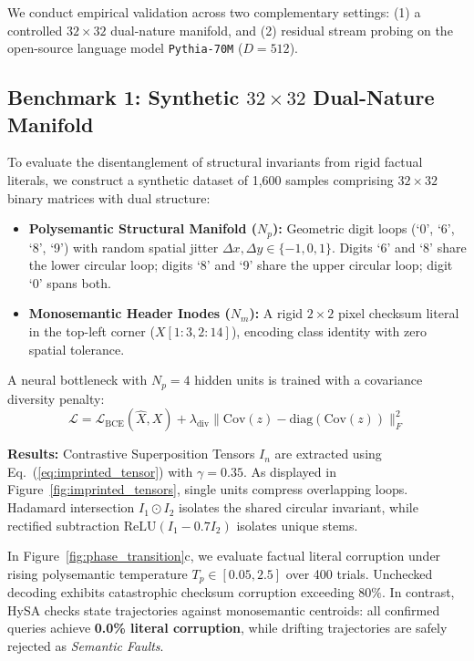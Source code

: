 \documentclass[11pt,a4paper]{article}
\theoremstyle{definition}
\begin{document}
We conduct empirical validation across two complementary settings: (1) a controlled $32 \times 32$ dual-nature manifold, and (2) residual stream probing on the open-source language model \texttt{Pythia-70M} ($D=512$).

\subsection{Benchmark 1: Synthetic \texorpdfstring{$32 \times 32$}{32x32} Dual-Nature Manifold}
To evaluate the disentanglement of structural invariants from rigid factual literals, we construct a synthetic dataset of 1,600 samples comprising $32 \times 32$ binary matrices with dual structure:
\begin{itemize}[leftmargin=*, itemsep=1.5pt]
    \item \textbf{Polysemantic Structural Manifold ($N_p$):} Geometric digit loops (`0', `6', `8', `9') with random spatial jitter $\Delta x, \Delta y \in \{-1, 0, 1\}$. Digits `6' and `8' share the lower circular loop; digits `8' and `9' share the upper circular loop; digit `0' spans both.
    \item \textbf{Monosemantic Header Inodes ($N_m$):} A rigid $2 \times 2$ pixel checksum literal in the top-left corner ($X[1:3, 2:14]$), encoding class identity with zero spatial tolerance.
\end{itemize}

A neural bottleneck with $N_p=4$ hidden units is trained with a covariance diversity penalty:
\begin{equation}
    \mathcal{L} = \mathcal{L}_{\mathrm{BCE}}(\hat{X}, X) + \lambda_{\mathrm{div}} \|\mathrm{Cov}(z) - \mathrm{diag}(\mathrm{Cov}(z))\|_F^2
\end{equation}

\textbf{Results:} Contrastive Superposition Tensors $I_n$ are extracted using Eq.~(\ref{eq:imprinted_tensor}) with $\gamma = 0.35$. As displayed in Figure~\ref{fig:imprinted_tensors}, single units compress overlapping loops. Hadamard intersection $I_1 \odot I_2$ isolates the shared circular invariant, while rectified subtraction $\mathrm{ReLU}(I_1 - 0.7 I_2)$ isolates unique stems. 

In Figure~\ref{fig:phase_transition}c, we evaluate factual literal corruption under rising polysemantic temperature $T_p \in [0.05, 2.5]$ over 400 trials. Unchecked decoding exhibits catastrophic checksum corruption exceeding $80\%$. In contrast, HySA checks state trajectories against monosemantic centroids: all confirmed queries achieve \textbf{0.0\% literal corruption}, while drifting trajectories are safely rejected as \textit{Semantic Faults}.
\end{document}
